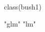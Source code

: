 \begin{Schunk}
\begin{Sinput}
 class(bush1)
\end{Sinput}
\begin{Soutput}
[1] "glm" "lm" 
\end{Soutput}
\end{Schunk}
